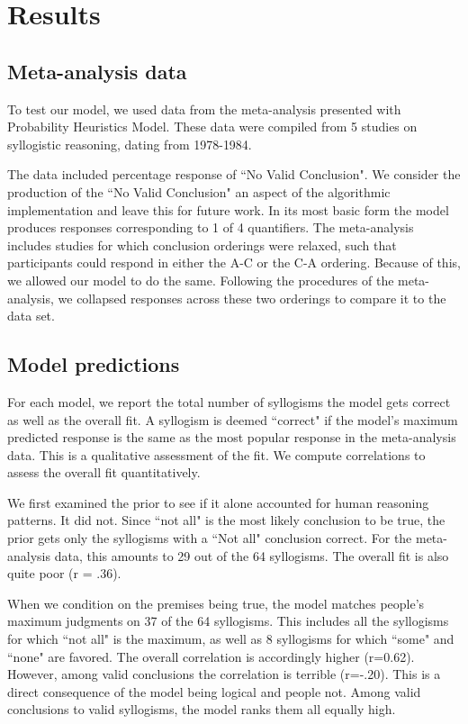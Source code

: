 \documentclass[10pt,letterpaper]{article}
\begin{document}
\section{Results}

\subsection{Meta-analysis data}
To test our model, we used data from the meta-analysis presented with Probability Heuristics Model. These data were compiled from 5 studies on syllogistic reasoning, dating from 1978-1984. 

The data included percentage response of ``No Valid Conclusion". We consider the production of the ``No Valid Conclusion" an aspect of the algorithmic implementation and leave this for future work. In its most basic form the model produces responses corresponding to 1 of 4 quantifiers. The meta-analysis includes studies for which conclusion orderings were relaxed, such that participants could respond in either the A-C or the C-A ordering. Because of this, we allowed our model to do the same. Following the procedures of the meta-analysis, we collapsed responses across these two orderings to compare it to the data set.
\subsection{Model predictions}
For each model, we report the total number of syllogisms the model gets correct as well as the overall fit. A syllogism is deemed ``correct" if the model's maximum predicted response is the same as the most popular response in the meta-analysis data. This is a qualitative assessment of the fit. We compute correlations to assess the overall fit quantitatively. 

We first examined the prior to see if it alone accounted for human reasoning patterns. It did not. Since ``not all" is the most likely conclusion to be true, the prior gets only the syllogisms with a ``Not all" conclusion correct. For the meta-analysis data, this amounts to 29 out of the 64 syllogisms. The overall fit is also quite poor (r = .36). 

When we condition on the premises being true, the model matches people's maximum judgments on 37 of the 64 syllogisms. This includes all the syllogisms for which ``not all" is the maximum, as well as 8 syllogisms for which ``some" and ``none" are favored. The overall correlation is accordingly higher (r=0.62). However, among valid conclusions the correlation is terrible (r=-.20). This is a direct consequence of the model being logical and people not. Among valid conclusions to valid syllogisms, the model ranks them all equally high. 
\end{document}
